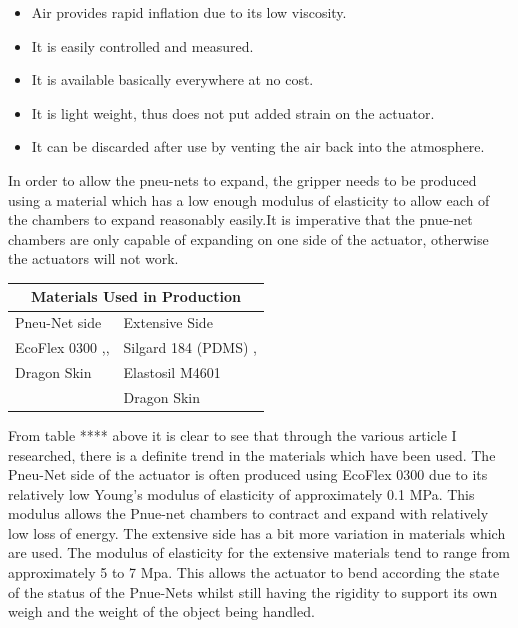 \documentclass[11pt]{article}
\begin{document}
\begin{itemize}
\item Air provides rapid inflation due to its low viscosity.
\item It is easily controlled and measured.
\item It is available basically everywhere at no cost.
\item It is light weight, thus does not put added strain on the actuator.
\item It can be discarded after use by venting the air back into the atmosphere.
\\
\newline
\end{itemize}
In order to allow the pneu-nets to expand, the gripper needs to be produced using a material which has a low enough modulus of elasticity to allow each of the chambers to expand reasonably easily.It is imperative that the pnue-net chambers are only capable of expanding on one side of the actuator, otherwise the actuators will not work.
\begin{center}
\begin{tabular}{ |p{6cm}||p{6cm}| }
 \hline
 \multicolumn{2}{|c|}{Materials Used in Production} \\
 \hline
 Pneu-Net side & Extensive Side\\
 \hline
 EcoFlex 0300 \cite{ilievski2011soft},\cite{bilodeau2015monolithic},\cite{mosadegh2014pneumatic}   & Silgard 184 (PDMS)  \cite{ilievski2011soft},\cite{bilodeau2015monolithic} \\
 Dragon Skin \cite{hao2016universal} &   Elastosil M4601 \cite{mosadegh2014pneumatic}\\
 & Dragon Skin \cite{hao2016universal}\\
 \hline
\end{tabular}
\end{center}

From table **** above it is clear to see that through the various article I researched, there is a definite trend in the materials  which have been used. The Pneu-Net side of the actuator is often produced using EcoFlex 0300 due to its relatively low Young's modulus of elasticity of approximately 0.1 MPa. This modulus allows the Pnue-net chambers to contract and expand with relatively low loss of energy. The extensive side has a bit more variation in materials which are used. The modulus of elasticity for the extensive materials tend to range from approximately 5 to 7 Mpa. This allows the actuator to bend according the state of the status of the Pnue-Nets whilst still having the rigidity to support its own weigh and the weight of the object being handled.
\end{document}
